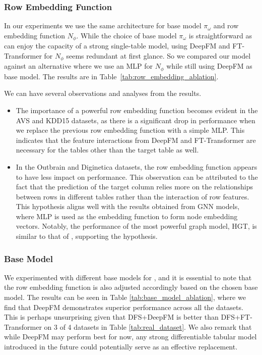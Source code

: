 \subsubsection{Row Embedding Function}
In our experiments we use the same architecture for base model $\pi_\omega$ and row embedding function $N_\phi$.  While the choice of base model $\pi_\omega$ is straightforward as \model{} can enjoy the capacity of a strong single-table model, using DeepFM and FT-Transformer for $N_\phi$ seems redundant at first glance.  So we compared our model against an alternative where we use an MLP for $N_\phi$ while still using DeepFM as base model.  The results are in Table~\ref{tab:row_embedding_ablation}.

We can have several observations and analyses from the results.
\begin{itemize}[leftmargin=*]
    \item The importance of a powerful row embedding function becomes evident in the AVS and KDD15 datasets, as there is a significant drop in performance when we replace the previous row embedding function with a simple MLP.
    This indicates that the feature interactions from DeepFM and FT-Transformer are necessary for the tables other than the target table as well.
    \item In the Outbrain and Diginetica datasets, the row embedding function appears to have less impact on performance. This observation can be attributed to the fact that the prediction of the target column relies more on the relationships between rows in different tables rather than the interaction of row features. This hypothesis aligns well with the results obtained from GNN models, where MLP is used as the embedding function to form node embedding vectors. Notably, the performance of the most powerful graph model, HGT, is similar to that of \model{}, supporting the hypothesis.
\end{itemize}

\subsubsection{Base Model}
We experimented with different base models for \model{}, and it is essential to note that the row embedding function is also adjusted accordingly based on the chosen base model. The results can be seen in Table \ref{tab:base_model_ablation}, where we find that DeepFM demonstrates superior performance across all the datasets.  This is perhaps unsurprising given that DFS+DeepFM is better than DFS+FT-Transformer on 3 of 4 datasets in Table \ref{tab:real_dataset}.  We also remark that while DeepFM may perform best for now, any strong differentiable tabular model introduced in the future could potentially serve as an effective replacement. 

